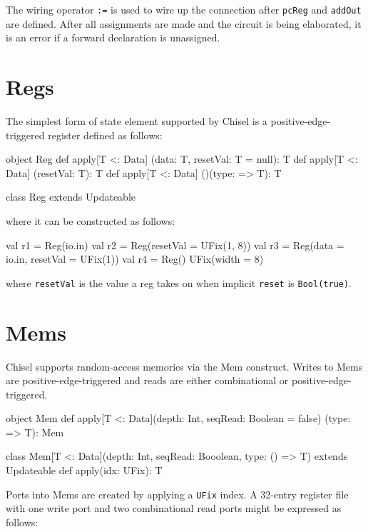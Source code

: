 \documentclass[10pt,twocolumn]{article}
\def\code#1{{\small\tt #1}}
\begin{document}
\noindent
The wiring operator
\verb!:=! is used to wire up
the connection after \verb!pcReg! and \verb!addOut! are defined.
After all assignments are made and the circuit is being elaborated, 
it is an error if a forward declaration is unassigned.

\section{Regs}

The simplest form of state element supported by Chisel is a
positive-edge-triggered register defined as follows:

\begin{scala}
object Reg {
  def apply[T <: Data]
        (data: T, resetVal: T = null): T
  def apply[T <: Data] (resetVal: T): T
  def apply[T <: Data] ()(type: => T): T
}
 
class Reg extends Updateable
\end{scala}

\noindent
where it can be constructed as follows:

\begin{scala}
val r1 = Reg(io.in)
val r2 = Reg(resetVal = UFix(1, 8))
val r3 = Reg(data = io.in, resetVal = UFix(1))
val r4 = Reg(){ UFix(width = 8) }
\end{scala}

\noindent
where \code{resetVal} is the value a reg takes on when implicit
\code{reset} is \code{Bool(true)}.

\section{Mems}

Chisel supports random-access memories via the Mem construct.  Writes to Mems
are positive-edge-triggered and reads are either combinational or
positive-edge-triggered.  

\begin{scala}
object Mem {
  def apply[T <: Data](depth: Int,
          seqRead: Boolean = false)
        (type: => T): Mem
}

class Mem[T <: Data](depth: Int,
      seqRead: Booolean,
      type: () => T) 
    extends Updateable {
  def apply(idx: UFix): T
}
\end{scala}

Ports into Mems are created by applying a \code{UFix} index.  A 32-entry
register file with one write port and two combinational read ports might be
expressed as follows:
\end{document}
